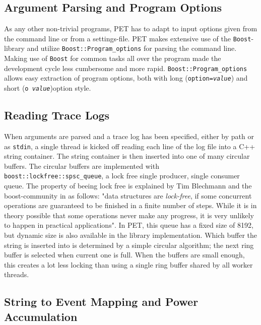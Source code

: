 \subsection{Argument Parsing and Program Options}

As any other non-trivial programs, PET has to adapt to input options given from
the command line or from a settings-file. PET makes extensive use of the
\texttt{Boost}-library \cite{boostwebpage} and utilize
\texttt{Boost::Program\_options} for parsing the command line. Making use of
\texttt{Boost} for common tasks all over the program made the development cycle
less cumbersome and more rapid. \texttt{Boost::Program\_options} allows easy
extraction of program options, both with long (\texttt{\textemdash \textemdash option=\emph{value}})
and short (\texttt{\textemdash o~\emph{value}})option style.


\subsection{Reading Trace Logs}

When arguments are parsed and a trace log has been specified, either by path or
as \texttt{stdin}, a single thread is kicked off reading each line of the log
file into a C++ string container. The string container is then inserted into one
of many circular buffers. The circular buffers are implemented with
\texttt{boost::lockfree::spsc\_queue}, a lock free single producer, single
consumer queue. The property of beeing lock free is explained by Tim Blechmann
and the boost-community in \cite{boostlockfree} as follows: "data structures are
\emph{lock-free}, if some concurrent operations are guaranteed to be finished in a
finite number of steps. While it is in theory possible that some operations
never make any progress, it is very unlikely to happen in practical
applications". In PET, this queue has a fixed size of 8192, but dynamic size is
also available in the library implementation.  Which buffer the string is
inserted into is determined by a simple circular algorithm; the next ring buffer
is selected when current one is full. When the buffers are small enough, this
creates a lot less locking than using a single ring buffer shared by all worker
threads.


\subsection{String to Event Mapping and Power Accumulation}

